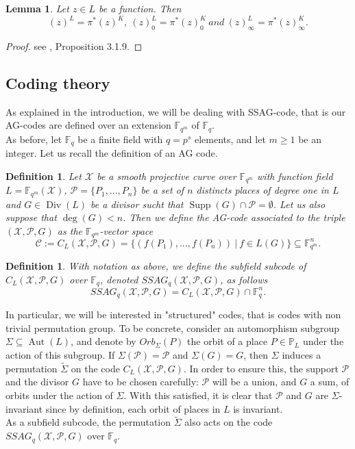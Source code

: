 \documentclass[10pt]{article}
\newtheorem{def1}[thm]{Definition}
\newtheorem{lem1}[thm]{Lemma}
\newcommand{\s}{\vspace{0.3cm}}
\newcommand{\PP}{\mathbb{P}}
\newcommand{\fqm}{\mathbb{F}_{q^m}}
\newcommand{\fq}{\mathbb{F}_q}
\newcommand{\su}{\subseteq}
\newcommand{\X}{\mathcal{X}}
\newcommand{\PR}{\mathcal{P}}
\newcommand{\Div}{\operatorname{Div}}
\newcommand{\Supp}{\operatorname{Supp}}
\newcommand{\Aut}{\operatorname{Aut}}
\begin{document}
\s

\begin{lem1} \label{tiréarr}
Let $z \in L$ be a function. Then 
\[(z)^L = \pi^*(z)^K, \ (z)^L_0 = \pi^*(z)_0^K \ and \ (z)^L_{\infty} = \pi^*(z)^K_{\infty}.\]
\end{lem1} 

\s

\begin{proof}
see \cite{Sti}, Proposition 3.1.9.
\end{proof}

\s

\subsection{Coding theory}

\s

As explained in the introduction, we will be dealing with SSAG-code, that is our AG-codes are defined over an extension $\fqm$ of $\fq$. \\
As before, let $\fq$ be a finite field with $q=p^s$ elements, and let $m \geq 1$ be an integer. Let us recall the definition of an AG code.

\s

\begin{def1}
Let $\X$ be a smooth projective curve over $\fqm$ with function field $L = \fqm(\X)$, $\PR = \{P_1,...,P_n\}$ be a set of $n$ distincts places of degree one in $L$  and $G \in \Div(L)$ be a divisor sucht that $\Supp(G) \cap \PR = \emptyset$. Let us also suppose that $\deg(G)<n$. Then we define the AG-code associated to the triple $(\X,\PR,G)$ as the $\fqm$-vector space
\[\mathcal{C} := C_L(\X,\PR,G) = \{ (f(P_1),...,f(P_n)) \ | \ f \in L(G)\} \su \fqm^n.\]
\end{def1}

\s

\begin{def1}
With notation as above, we define the subfield subcode of $C_L(\X,\PR,G)$ over $\fq$, denoted $SSAG_q(\X,\PR,G)$, as follows
\[ SSAG_q(\X,\PR,G) = C_L(\X,\PR,G) \cap \fq^n.\]
\end{def1}

\s

In particular, we will be interested in "structured" codes, that is codes with non trivial permutation group. To be concrete, consider an automorphism subgroup $\Sigma \su \Aut(L)$, and denote by $Orb_{\Sigma}(P)$ the orbit of a place $P \in \PP_L$ under the action of this subgroup. If $\Sigma(\PR) = \PR$ and $\Sigma(G)=G$, then $\Sigma$ induces a permutation $\tilde{\Sigma}$ on the code $C_L(\X,\PR,G)$. In order to ensure this, the support $\PR$ and the divisor $G$ have to be chosen carefully: $\PR$ will be a union, and $G$ a sum, of orbits under the action of $\Sigma$. With this satisfied, it is clear that $\PR$ and $G$ are $\Sigma$-invariant since by definition, each orbit of places in $L$ is invariant. \\
As a subfield subcode, the permutation $\tilde{\Sigma}$ also acts on the code $SSAG_q(\X,\PR,G)$ over $\fq$.
\end{document}
